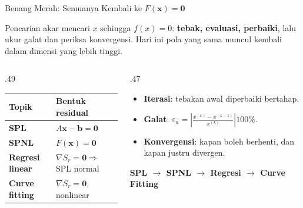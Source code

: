 \documentclass[aspectratio=169,10pt]{beamer}
\begin{document}
\begin{frame}{Benang Merah: Semuanya Kembali ke $F(\mathbf{x})=\mathbf{0}$}
\scriptsize
\begin{bluebox}
Pencarian akar mencari $x$ sehingga $f(x)=0$: \textbf{tebak, evaluasi, perbaiki}, lalu ukur galat dan periksa konvergensi. Hari ini pola yang sama muncul kembali dalam dimensi yang lebih tinggi.
\end{bluebox}
\vspace{1mm}
\begin{columns}[T,totalwidth=\textwidth]
\begin{column}{.49\textwidth}
\begin{orangebox}
\begin{tabularx}{\linewidth}{>{\bfseries}p{.26\linewidth} X}
\toprule
Topik & Bentuk residual\\
\midrule
SPL & $A\mathbf{x}-\mathbf{b}=\mathbf{0}$\\
SPNL & $F(\mathbf{x})=\mathbf{0}$\\
Regresi linear & $\nabla S_r=\mathbf{0}\Rightarrow$ SPL normal\\
Curve fitting & $\nabla S_r=\mathbf{0}$, nonlinear\\
\bottomrule
\end{tabularx}
\end{orangebox}
\end{column}
\begin{column}{.47\textwidth}
\begin{greenbox}
\begin{itemize}\setlength\itemsep{2pt}
\item \textbf{Iterasi}: tebakan awal diperbaiki bertahap.
\item \textbf{Galat}: $\varepsilon_a=\left|\frac{x^{(k)}-x^{(k-1)}}{x^{(k)}}\right|100\%$.
\item \textbf{Konvergensi}: kapan boleh berhenti, dan kapan justru divergen.
\end{itemize}
\end{greenbox}
\begin{goldbox}
\centering\textbf{SPL $\rightarrow$ SPNL $\rightarrow$ Regresi $\rightarrow$ Curve Fitting}
\end{goldbox}
\end{column}
\end{columns}
\end{frame}
\end{document}
